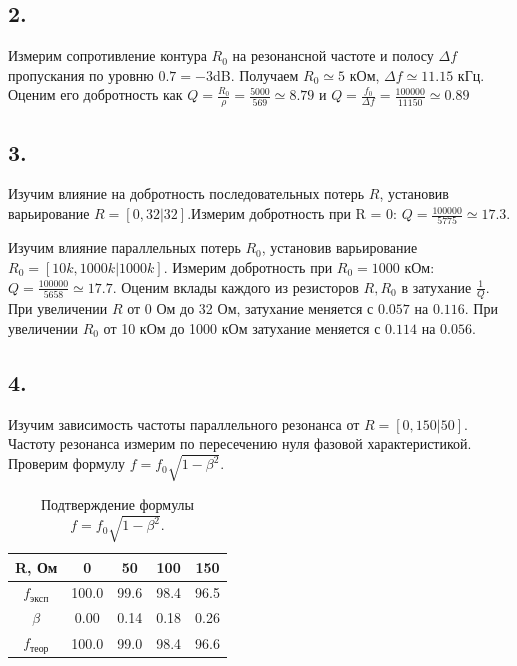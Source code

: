 \documentclass[a4paper, 12pt, twoside]{article}
\begin{document}
\subsection*{2.}

Измерим сопротивление контура $R_0$ на резонансной частоте и полосу $\Delta f$ пропускания по уровню $0.7 = -3$dB. Получаем $R_0 \simeq 5 $ кОм, $\Delta f \simeq 11.15$ кГц. Оценим его добротность как $Q = \frac{R_0}{\rho} = \frac{5000}{569} \simeq 8.79$ и $Q = \frac{f_0}{\Delta f} = \frac{100000}{11150} \simeq 0.89$

\subsection*{3.}

Изучим влияние на добротность последовательных потерь $R$, установив варьирование $R = [0,32|32]$.Измерим добротность при R = 0: $Q =\frac{100000}{5775} \simeq 17.3$. 

Изучим влияние параллельных потерь $R_0$, установив варьирование $R_0 = [10k,1000k|1000k]$. Измерим добротность при $R_0 = 1000$ кОм: $Q = \frac{100000}{5658} \simeq 17.7$. Оценим вклады каждого из резисторов $R, R_0$ в затухание $\frac{1}{Q}$.  При увеличении $R$ от 0 Ом до 32 Ом, затухание меняется с $0.057$ на $0.116$. При увеличении $R_0$ от 10 кОм до 1000 кОм  затухание меняется с $0.114$ на $0.056$.

\subsection*{4.}

Изучим зависимость частоты параллельного резонанса от $R = [0,150|50]$. Частоту резонанса измерим по пересечению нуля фазовой характеристикой. Проверим формулу $f = f_0\sqrt{1-\beta^2}$.

\begin{table}[H]
	\centering
	\caption{Подтверждение формулы $f = f_0\sqrt{1-\beta^2}$.}
	
	\begin{tabular}{|c|c|c|c|c|}
		\hline
		R, Ом             & 0   & 50   & 100  & 150  \\ \hline
		$f_{\text{эксп}}$ & 100.0 & 99.6 & 98.4 & 96.5 \\ \hline
		$\beta$           & 0.00   & 0.14 & 0.18 & 0.26 \\ \hline
		$f_{\text{теор}}$ & 100.0 & 99.0   & 98.4 & 96.6 \\ \hline
	\end{tabular}
\end{table} 
\end{document}
